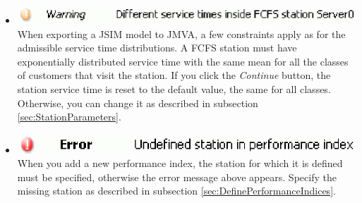\begin{itemize}
\item \includegraphics[scale=.5]{img/jsim/13.eps}\\
When exporting a JSIM model to JMVA, a few constraints apply as for the admissible service time distributions. A FCFS station must have exponentially distributed service time with the same mean for all the classes of customers that visit the station. If you click the \emph{Continue} button, the station service time is
reset to the default value, the same for all classes. Otherwise, you can change it as described in subsection \ref{sec:StationParameters}.
\item \includegraphics[scale=.5]{img/jsim/14.eps}\\
When you add a new performance index, the station for which it is defined must be specified, otherwise the error message above appears. Specify the missing station as described in subsection  \autoref{sec:DefinePerformanceIndices}.
\end{itemize}

